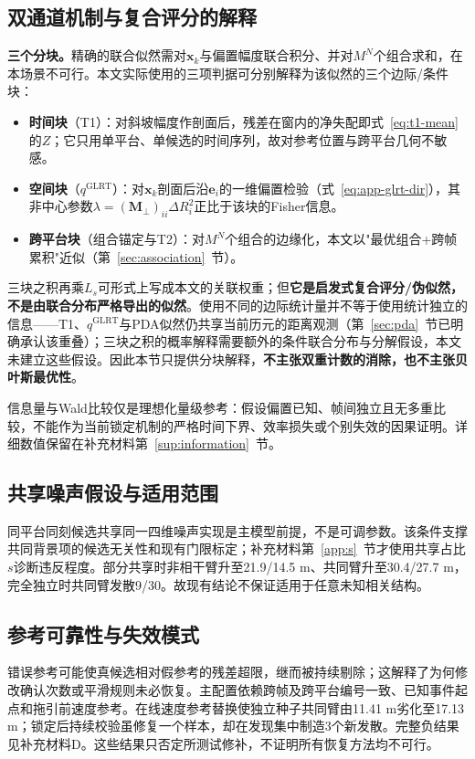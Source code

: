 \documentclass[UTF8,a4paper,zihao=-4]{ctexart}
\begin{document}
\subsection{双通道机制与复合评分的解释}\label{sec:discussion-mechanism}
\label{sec:unified-likelihood}
\noindent\textbf{三个分块。}\quad 精确的联合似然需对\(\boldsymbol x_k\)与偏置幅度联合积分、并对\(M^N\)个组合求和，在本场景不可行。本文实际使用的三项判据可分别解释为该似然的三个边际/条件块：
\begin{itemize}
\item \textbf{时间块}（T1）：对斜坡幅度作剖面后，残差在窗内的净失配即式~\eqref{eq:t1-mean} 的\(Z\)；它只用单平台、单候选的时间序列，故对参考位置与跨平台几何不敏感。
\item \textbf{空间块}（\(q^{\mathrm{GLRT}}\)）：对\(\boldsymbol x_k\)剖面后沿\(\mathbf e_i\)的一维偏置检验（式~\eqref{eq:app-glrt-dir}），其非中心参数\(\lambda=(\boldsymbol M_{\perp})_{ii}\Delta R_i^2\)正比于该块的Fisher信息。
\item \textbf{跨平台块}（组合锚定与T2）：对\(M^N\)个组合的边缘化，本文以"最优组合+跨帧累积"近似（第~\ref{sec:association}~节）。
\end{itemize}
三块之积再乘\(L_s\)可形式上写成本文的关联权重；但\textbf{它是启发式复合评分/伪似然，不是由联合分布严格导出的似然}。使用不同的边际统计量并不等于使用统计独立的信息——T1、\(q^{\mathrm{GLRT}}\)与PDA似然仍共享当前历元的距离观测（第~\ref{sec:pda}~节已明确承认该重叠）；三块之积的概率解释需要额外的条件联合分布与分解假设，本文未建立这些假设。因此本节只提供分块解释，\textbf{不主张双重计数的消除，也不主张贝叶斯最优性}。

信息量与Wald比较仅是理想化量级参考：假设偏置已知、帧间独立且无多重比较，不能作为当前锁定机制的严格时间下界、效率损失或个别失效的因果证明。详细数值保留在补充材料第~\ref{sup:information}~节。


\subsection{共享噪声假设与适用范围}\label{sec:discussion-noise}
同平台同刻候选共享同一四维噪声实现是主模型前提，不是可调参数。该条件支撑共同背景项的候选无关性和现有门限标定；补充材料第~\ref{app:s}~节才使用共享占比\(s\)诊断违反程度。部分共享时非相干臂升至21.9/14.5 m、共同臂升至30.4/27.7 m，完全独立时共同臂发散9/30。故现有结论不保证适用于任意未知相关结构。


\subsection{参考可靠性与失效模式}\label{sec:discussion-reference}
错误参考可能使真候选相对假参考的残差超限，继而被持续剔除；这解释了为何修改确认次数或平滑规则未必恢复。主配置依赖跨帧及跨平台编号一致、已知事件起点和拖引前速度参考。在线速度参考替换使独立种子共同臂由11.41 m劣化至17.13 m；锁定后持续校验虽修复一个样本，却在发现集中制造3个新发散。完整负结果见补充材料D。这些结果只否定所测试修补，不证明所有恢复方法均不可行。
\end{document}
